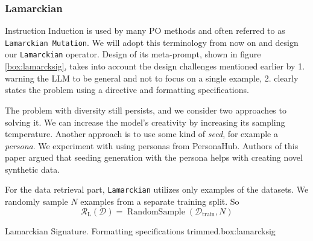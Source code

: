 \subsubsection{Lamarckian}
Instruction Induction\cite{honovich2022instructioninductionexamplesnatural} is used by many PO methods and often referred to as \texttt{Lamarckian Mutation}. 
We will adopt this terminology from now on and design our \texttt{Lamarckian} operator. 
Design of its meta-prompt, shown in figure \ref{box:lamarcksig}, takes into account the design challenges mentioned earlier by 1. warning the LLM to be general and not to focus on a single example, 
2. clearly states the problem using a directive and formatting specifications. 

The problem with diversity still persists, and we consider two approaches to solving it. 
We can increase the model's creativity by increasing its sampling temperature. Another approach is to use
some kind of \textit{seed}, for example a \textit{persona}. We experiment with using personas from PersonaHub\cite{ge2024scalingsyntheticdatacreation}.
Authors of this paper argued that seeding generation with the persona helps with creating novel synthetic data. 

For the data retrieval part, \texttt{Lamarckian} utilizes only examples of the datasets. 
We randomly sample $N$ examples from a separate training split. So
\begin{equation}
    \mathcal{R}_{\text{L}}(\mathcal{D}) = \operatorname{RandomSample}(\mathcal{D}_{\text{train}}, N)
\end{equation}
\begin{figurebox}{Lamarckian Signature. Formatting specifications trimmed.}{box:lamarcksig}
\end{figurebox}
\newpage
